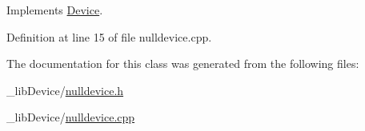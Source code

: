 Implements \hyperlink{class_device_aab20e3f9dc696c6a1153776d526dcc0b}{Device}.



Definition at line 15 of file nulldevice.\+cpp.



The documentation for this class was generated from the following files\+:\begin{DoxyCompactItemize}
\item 
\+\_\+lib\+Device/\hyperlink{nulldevice_8h}{nulldevice.\+h}\item 
\+\_\+lib\+Device/\hyperlink{nulldevice_8cpp}{nulldevice.\+cpp}\end{DoxyCompactItemize}
